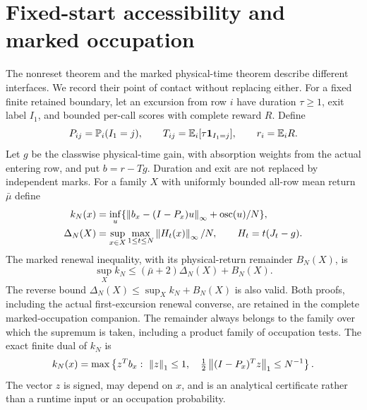 \section{Fixed-start accessibility and marked occupation}\label{sec:accessibility}
The nonreset theorem and the marked physical-time theorem describe different interfaces. We record their point of contact without replacing either. For a fixed finite retained boundary, let an excursion from row $i$ have duration $\tau\ge1$, exit label $I_1$, and bounded per-call scores with complete reward $R$. Define
\[
 P_{ij}=\mathbb P_i(I_1=j),\qquad T_{ij}=\mathbb E_i[\tau\mathbf 1_{I_1=j}],\qquad r_i=\mathbb E_iR.
\]
Let $g$ be the classwise physical-time gain, with absorption weights from the actual entering row, and put $b=r-Tg$. Duration and exit are not replaced by independent marks. For a family $X$ with uniformly bounded all-row mean return $\bar\mu$ define
\begin{align*}
 k_N(x)&=\inf_u\{\left\lVert b_x-(I-P_x)u\right\rVert_\infty+\operatorname{osc}(u)/N\},\\
 \Delta_N(X)&=\sup_{x\in X}\max_{1\le t\le N}\left\lVert H_t(x)\right\rVert_\infty/N,
 \qquad H_t=t(J_t-g).
\end{align*}
The marked renewal inequality, with its physical-return remainder $B_N(X)$, is
\begin{equation}\label{eq:inherited-marked}
 \sup_X k_N\le(\bar\mu+2)\Delta_N(X)+B_N(X).
\end{equation}
The reverse bound $\Delta_N(X)\le\sup_X k_N+B_N(X)$ is also valid. Both proofs, including the actual first-excursion renewal converse, are retained in the complete marked-occupation companion. The remainder always belongs to the family over which the supremum is taken, including a product family of occupation tests. The exact finite dual of $k_N$ is
\begin{equation}\label{eq:marked-dual}
 k_N(x)=\max\left\{z^Tb_x:\ \left\lVert z\right\rVert_1\le1,\quad
 \tfrac12\left\lVert(I-P_x)^Tz\right\rVert_1\le N^{-1}\right\}.
\end{equation}
The vector $z$ is signed, may depend on $x$, and is an analytical certificate rather than a runtime input or an occupation probability.

